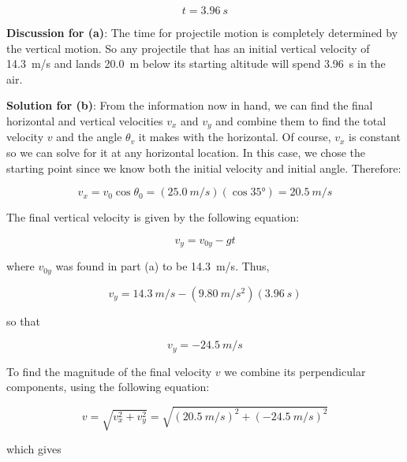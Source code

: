 \documentclass[../../main-ap-physics.tex]{subfiles}
\begin{document}
\begin{equation*}
    t = \SI{3.96}{s}
\end{equation*}

\textbf{Discussion for (a)}: The time for projectile motion is completely determined by the vertical motion. So any projectile that has an initial vertical velocity of \SI{14.3}{m/s} and lands \SI{20.0}{m} below its starting altitude will spend \SI{3.96}{s} in the air.

\vspace{1em}

\textbf{Solution for (b)}: From the information now in hand, we can find the final horizontal and vertical velocities $v_x$ and $v_y$ and combine them to find the total velocity $v$ and the angle $\theta_v$ it makes with the horizontal. Of course, $v_x$ is constant so we can solve for it at any horizontal location. In this case, we chose the starting point since we know both the initial velocity and initial angle. Therefore:

\begin{equation*}
    v_x = v_0 \cos{\theta_0} = \left(\SI{25.0}{m/s}\right) \left(\cos{\ang{35}}\right) = \SI{20.5}{m/s}
\end{equation*}

The final vertical velocity is given by the following equation:

\begin{equation*}
    v_y = v_{0y} - gt
\end{equation*}

where $v_{0y}$ was found in part (a) to be \SI{14.3}{m/s}. Thus,

\begin{equation*}
    v_y = \SI{14.3}{m/s} - \left(\SI{9.80}{m/s^2}\right) \left(\SI{3.96}{s}\right)
\end{equation*}

so that

\begin{equation*}
    v_y = -\SI{24.5}{m/s}
\end{equation*}

To find the magnitude of the final velocity $v$ we combine its perpendicular components, using the following equation:

\begin{equation*}
    v = \sqrt{v_x^2 + v_y^2} = \sqrt{\left(\SI{20.5}{m/s}\right)^2 + \left(-\SI{24.5}{m/s}\right)^2}
\end{equation*}

which gives
\end{document}
